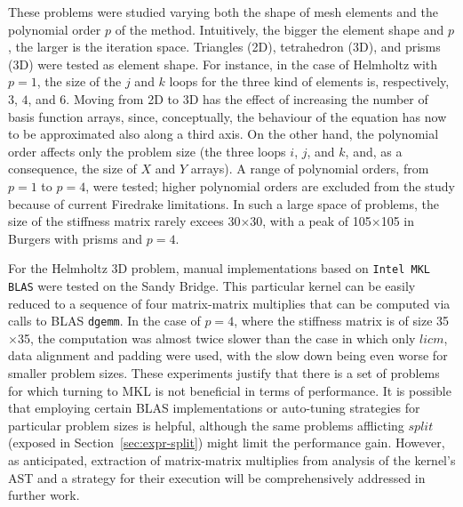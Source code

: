 \documentclass[conference]{IEEEtran}
\begin{document}
These problems were studied varying both the shape of mesh elements and the polynomial order $p$ of the method. Intuitively, the bigger the element shape and $p$, the larger is the iteration space. Triangles (2D), tetrahedron (3D), and prisms (3D) were tested as element shape. For instance, in the case of Helmholtz with $p=1$, the size of the $j$ and $k$ loops for the three kind of elements is, respectively, $3$, $4$, and $6$. Moving from 2D to 3D has the effect of increasing the number of basis function arrays, since, conceptually, the behaviour of the equation has now to be approximated also along a third axis. On the other hand, the polynomial order affects only the problem size (the three loops $i$, $j$, and $k$, and, as a consequence, the size of $X$ and $Y$ arrays). A range of polynomial orders, from $p=1$ to $p=4$, were tested; higher polynomial orders are excluded from the study because of current Firedrake limitations. In such a large space of problems, the size of the stiffness matrix rarely excees 30$\times$30, with a peak of 105$\times$105 in Burgers with prisms and $p=4$. 

For the Helmholtz 3D problem, manual implementations based on \texttt{Intel MKL BLAS} were tested on the Sandy Bridge. This particular kernel can be easily reduced to a sequence of four matrix-matrix multiplies that can be computed via calls to BLAS \texttt{dgemm}. In the case of $p=4$, where the stiffness matrix is of size 35$\times$35, the computation was almost twice slower than the case in which only $licm$, data alignment and padding were used, with the slow down being even worse for smaller problem sizes. These experiments justify that there is a set of problems for which turning to MKL is not beneficial in terms of performance. It is possible that employing certain BLAS implementations or auto-tuning strategies for particular problem sizes is helpful, although the same problems afflicting $split$ (exposed in Section~\ref{sec:expr-split}) might limit the performance gain. However, as anticipated, extraction of matrix-matrix multiplies from analysis of the kernel's AST and a strategy for their execution will be comprehensively addressed in further work.
\end{document}
